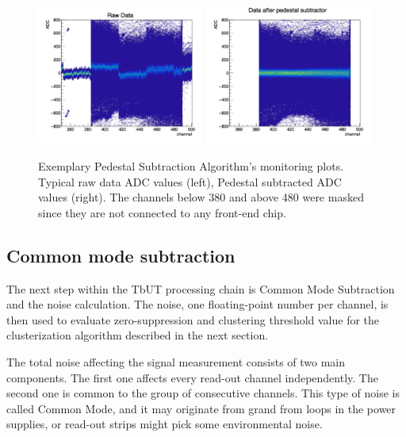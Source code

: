 \begin{figure}[tbph]
\begin{center}
\includegraphics[width = 0.49\textwidth]{figures/raw_data.png} 
\includegraphics[width = 0.49\textwidth]{figures/pedestal_data.png}
\caption{Exemplary Pedestal Subtraction Algorithm's monitoring plots. Typical raw data ADC values (left), Pedestal subtracted ADC values
(right). The channels below 380 and above 480 were masked since they are not connected to any front-end chip.} 
\label{fig:raw vs ped}
 \end{center}
\end{figure}


\subsection{Common mode subtraction}
The next step within the TbUT processing chain is Common Mode Subtraction and the noise calculation. The noise, one floating-point number per channel, is then used to evaluate zero-suppression and  clustering threshold value for the clusterization algorithm described in the next section. 

The total noise affecting the signal measurement consists of two main components. The first one affects every read-out channel independently. The second one is common to the group of consecutive channels. This type of noise is called Common Mode, and it may originate from grand from loops in the power supplies, or read-out strips might pick some environmental noise.

